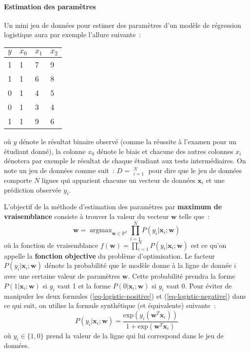 \documentclass[11pt,openany]{book}
\newcommand{\kw}[1]{{\bf #1}} %
\begin{document}
\paragraph{Estimation des paramètres}
Un mini jeu de données pour estimer des paramètres d'un modèle de
régression logistique aura par exemple l'allure suivante~:
\begin{center}
\begin{tabular}{llll}\toprule
$y$&$x_0$&$x_1$&$x_2$\\\midrule
1   & 1       &    7   &  9 \\
1   &    1    &    6    &8\\
0   & 1       &    4    & 5\\
0  & 1        &   3      &   4\\
1  &  1       &  9    &6\\\bottomrule
\end{tabular}
\end{center}
où $y$ dénote le résultat binaire observé (comme la réussite à
l'examen pour un étudiant donné), la colonne $x_0$ dénote le biais 
et chacune des autres colonnes $x_i$ dénotera par exemple le résultat
de chaque étudiant aux tests intermédiaires. On note un jeu de données 
comme suit~: $D= \mathop{(\mathbf{x}_i,y_i)}_{i=1}^N$ pour dire que le
jeu de données comporte $N$ lignes qui apparient chacune un vecteur de données
$\mathbf{x}_i$ et une prédiction observée $y_i$.

L'objectif de la méthode d'estimation des paramètres par \kw{maximum
  de vraisemblance} consiste à trouver la valeur du vecteur
$\mathbf{w}$ telle que~:
\begin{displaymath}
\mathbf{w} = \mathop{\text{argmax}}_{\mathbf{w} \in \mathbb{R}^d} \prod_{i=1}^N P(y_i|\mathbf{x}_i; \mathbf{w}) 
\end{displaymath}
où la fonction de vraisemblance $f(\mathbf{w}) =  \prod_{i=1}^N P(y_i|\mathbf{x}_i; \mathbf{w})$
est ce qu'on appelle la \kw{fonction objective} du problème d'optimisation.
Le facteur $P(y_i|\mathbf{x}_i; \mathbf{w})$ dénote la probabilité que
le modèle donne à la ligne de donnée $i$ avec une certaine valeur de
paramètres $\mathbf{w}$. Cette probabilité prendra la forme
$P(1|\mathbf{x}_i;\mathbf{w})$ si $y_i$ vaut 1 et la forme 
$P(0|\mathbf{x}_i;\mathbf{w})$ si $y_i$ vaut 0. Pour éviter de
manipuler les deux formules (\ref{eq-logistic-positive}) et (\ref{eq-logistic-negative}) dans ce qui suit,
on utilise la formule synthétique (et équivalente) suivante~:
\begin{displaymath}
P(y_i |\mathbf{x}_i;\mathbf{w}) = \frac{\text{exp}(y_i(\mathbf{w}^T\mathbf{x}_i))}{1+\text{exp}(\mathbf{w}^T\mathbf{x}_i)}
\end{displaymath}
où $y_i\in \{1,0\}$ prend la valeur de la ligne qui lui correspond dans le jeu de données.
\end{document}
